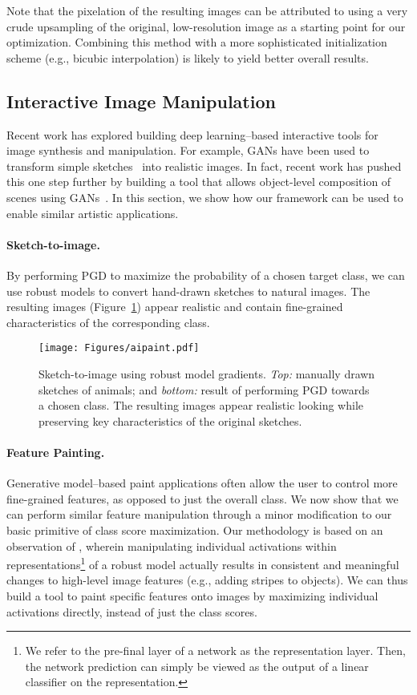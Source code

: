 \documentclass{article}
\begin{document}
{Note that the pixelation of the resulting images can be attributed to using a
very crude upsampling of the original, low-resolution image as a starting point for our
optimization. Combining this method with a more sophisticated initialization
scheme (e.g., bicubic interpolation) is likely to yield better overall
results.
 
\subsection{Interactive Image Manipulation}
\label{sec:paint}
Recent work has explored building deep learning--based interactive tools for
image synthesis and manipulation.
For example, GANs have been used to transform simple
sketches~\cite{chen2018sketchygan,park2019semantic} into realistic images.
In fact, recent work has pushed this one step further by building a tool
that allows object-level composition of scenes using GANs~\cite{bau2019gan}.
In this section, we show how our framework can be used to enable similar artistic applications.

\paragraph{Sketch-to-image.} By performing PGD to maximize the probability of 
a chosen target class, we can use robust models to convert 
hand-drawn sketches to natural images.  The resulting images (Figure~\ref{fig:aipaint}) 
appear realistic and contain fine-grained characteristics of the corresponding 
class.
\begin{figure}[!h]
\texttt{[image: Figures/aipaint.pdf]}
\caption[]{Sketch-to-image using robust model gradients. \emph{Top:} 
manually drawn sketches of animals; and \emph{bottom:} result of 
performing PGD towards a chosen class. The resulting images appear
realistic looking while preserving key characteristics of the original 
sketches\footnotemark.}
\label{fig:aipaint}
\end{figure}


\paragraph{Feature Painting.}
Generative model--based paint applications often allow the user to control more
fine-grained features, as opposed to just the overall class. We now show that we
can perform similar feature manipulation through a minor modification to our basic primitive
of class score maximization. Our methodology is based on an observation of 
\citet{engstrom2019learning},
wherein manipulating individual activations within representations\footnote{We refer 
	to the pre-final layer of a network as the representation layer. Then, the 
	network prediction can simply be viewed as the
	output of a linear classifier on the representation.} 
of a robust model actually results in consistent and meaningful 
changes to high-level image features (e.g., adding stripes to objects).  
We can thus build a tool to paint specific features onto images by
maximizing individual activations directly, instead of just the class scores.

}
\end{document}
